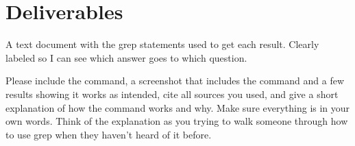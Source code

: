 \documentclass[12pt]{article}
\begin{document}
\section*{Deliverables}
A text document with the grep statements used to get each result.  Clearly labeled so I can see which answer goes to which question.


Please include the command, a screenshot that includes the command and a few results showing it works as intended, cite all sources you used, and give a short explanation of how the command works and why. Make sure everything is in your own words.  Think of the explanation as you trying to walk someone through how to use grep when they haven't heard of it before.

\end{document}
